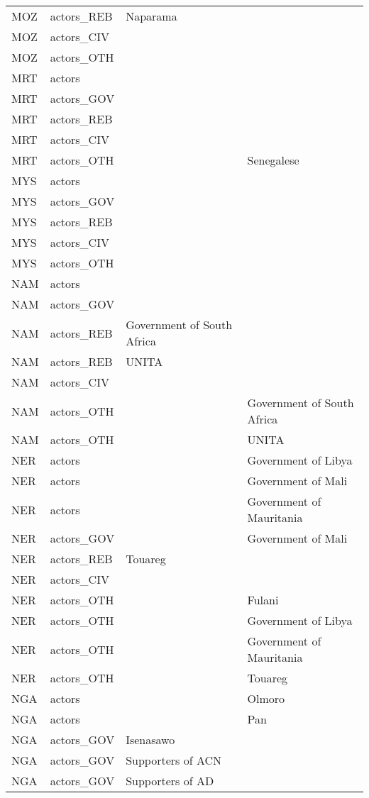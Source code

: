 \begin{table}[ht]
\begin{tabular}{llll}
  MOZ & actors\_REB & Naparama &  \\ 
  MOZ & actors\_CIV &  &  \\ 
  MOZ & actors\_OTH &  &  \\ 
  MRT & actors &  &  \\ 
  MRT & actors\_GOV &  &  \\ 
  MRT & actors\_REB &  &  \\ 
  MRT & actors\_CIV &  &  \\ 
  MRT & actors\_OTH &  & Senegalese \\ 
  MYS & actors &  &  \\ 
  MYS & actors\_GOV &  &  \\ 
  MYS & actors\_REB &  &  \\ 
  MYS & actors\_CIV &  &  \\ 
  MYS & actors\_OTH &  &  \\ 
  NAM & actors &  &  \\ 
  NAM & actors\_GOV &  &  \\ 
  NAM & actors\_REB & Government of South Africa &  \\ 
  NAM & actors\_REB & UNITA &  \\ 
  NAM & actors\_CIV &  &  \\ 
  NAM & actors\_OTH &  & Government of South Africa \\ 
  NAM & actors\_OTH &  & UNITA \\ 
  NER & actors &  & Government of Libya \\ 
  NER & actors &  & Government of Mali \\ 
  NER & actors &  & Government of Mauritania \\ 
  NER & actors\_GOV &  & Government of Mali \\ 
  NER & actors\_REB & Touareg &  \\ 
  NER & actors\_CIV &  &  \\ 
  NER & actors\_OTH &  & Fulani \\ 
  NER & actors\_OTH &  & Government of Libya \\ 
  NER & actors\_OTH &  & Government of Mauritania \\ 
  NER & actors\_OTH &  & Touareg \\ 
  NGA & actors &  & Olmoro \\ 
  NGA & actors &  & Pan \\ 
  NGA & actors\_GOV & Isenasawo &  \\ 
  NGA & actors\_GOV & Supporters of ACN &  \\ 
  NGA & actors\_GOV & Supporters of AD &  \\ 

\end{tabular}
\end{table}
